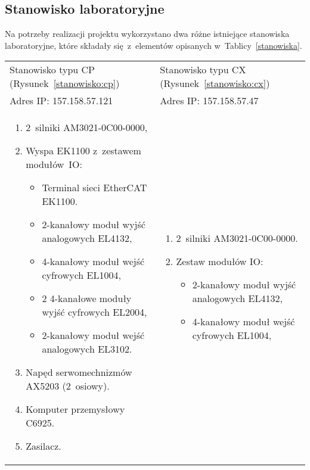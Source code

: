 \subsection{Stanowisko laboratoryjne}
Na potrzeby realizacji projektu wykorzystano dwa różne istniejące stanowiska laboratoryjne, które składały się~z~elementów opisanych w~Tablicy~\ref{stanowiska}.
\begin{table}[!htb]
\begin{center}
\begin{tabular}{| p{} | p{} |}\hline
Stanowisko typu CP (Rysunek~\ref{stanowisko:cp}) & Stanowisko typu CX (Rysunek~\ref{stanowisko:cx})  \\
Adres IP: 157.158.57.121 & Adres IP: 157.158.57.47  \\\hline
\begin{enumerate}[leftmargin=7mm]
\setlength{\itemsep}{5pt}
\setlength{\parskip}{0pt}
\setlength{\parsep}{0pt}
\item 2~silniki AM3021-0C00-0000,
\item Wyspa EK1100 z~zestawem modułów~IO:
\begin{itemize}[leftmargin=3mm]
\setlength{\itemsep}{3pt}
\setlength{\parskip}{0pt}
\setlength{\parsep}{0pt}
\item Terminal sieci EtherCAT EK1100.
\item 2-kanałowy moduł wyjść analogowych EL4132,
\item 4-kanałowy moduł wejść cyfrowych EL1004,
\item 2 4-kanałowe moduły wyjść cyfrowych EL2004,
\item 2-kanałowy moduł wejść analogowych EL3102.
\end{itemize}
\item Napęd serwomechnizmów AX5203 (2~osiowy).
\item Komputer przemysłowy C6925.
\item Zasilacz.
\end{enumerate}
&
\begin{enumerate}[leftmargin=7mm]
\setlength{\itemsep}{5pt}
\setlength{\parskip}{0pt}
\setlength{\parsep}{0pt}
\item 2~silniki AM3021-0C00-0000.
\item Zestaw modułów IO:
\begin{itemize}[leftmargin=3mm]
\setlength{\itemsep}{3pt}
\setlength{\parskip}{0pt}
\setlength{\parsep}{0pt}
\item 2-kanałowy moduł wyjść analogowych EL4132,
\item 4-kanałowy moduł wejść cyfrowych EL1004,

\end{itemize}
\end{enumerate}
\end{tabular}
\end{center}
\end{table}
